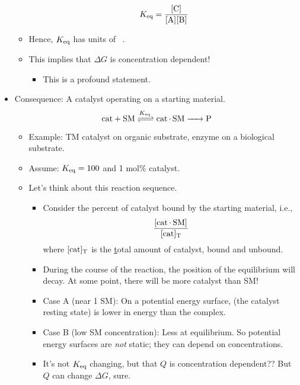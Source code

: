 \documentclass[../notes.tex]{subfiles}
\begin{document}
\begin{itemize}
\begin{itemize}
\begin{equation*}
            \Keq = \frac{\cnc{C}}{\cnc{A}\cnc{B}}
        \end{equation*}
        \item Hence, $K_\textup{eq}$ has units of \si{\per\molar}.
        \item This implies that $\Delta G$ is concentration dependent!
        \begin{itemize}
            \item This is a profound statement.
        \end{itemize}
    \end{itemize}
    \item Consequence: A catalyst operating on a starting material.
    \begin{equation*}
        \ce{cat + SM <=>[$\Keq$] cat*SM -> P}
    \end{equation*}
    \begin{itemize}
        \item Example: TM catalyst on organic substrate, enzyme on a biological substrate.
        \item Assume: $K_\textup{eq}=100$ and 1 mol\% catalyst.
        \item Let's think about this reaction sequence.
        \begin{itemize}
            \item Consider the percent of catalyst bound by the starting material, i.e.,
            \begin{equation*}
                \frac{\cnc{cat*SM}}{\cnc[T]{cat}}
            \end{equation*}
            where $\cnc[T]{cat}$ is the \underline{t}otal amount of catalyst, bound and unbound.
            \item During the course of the reaction, the position of the equilibrium will decay. At some point, there will be more catalyst than SM!
            \item Case A (near \SI{1}{\molar} SM): On a potential energy surface,  (the catalyst resting state) is lower in energy than the complex.
            \item Case B (low SM concentration): Less  at equilibrium. So potential energy surfaces are \emph{not} static; they can depend on concentrations.
            \item It's not $K_\textup{eq}$ changing, but that $Q$ is concentration dependent?? But $Q$ can change $\Delta G$, sure.
        \end{itemize}
    \end{itemize}

\end{itemize}
\end{document}
